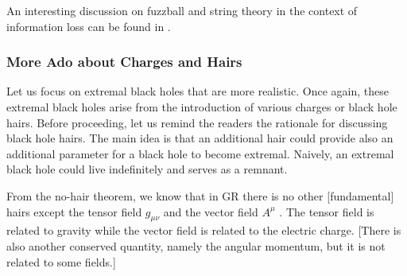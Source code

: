 \documentclass[12pt]{article}
\newcommand{\2}{$^2$}
\newcommand{\3}{$^3$}
\newcommand{\4}{$_4$}
\newcommand{\5}{$_5$}
\begin{document}
An interesting discussion on fuzzball and string theory in the context of information loss can be found in \cite{bena}.

\subsubsection{More Ado about Charges and Hairs}

Let us focus on extremal black holes that are more realistic. Once again, these extremal black holes arise from the introduction of various charges or black hole hairs. 
Before proceeding, let us remind the readers the rationale for discussing black hole hairs. The main idea is that an additional hair could provide also an additional parameter for a black hole to become extremal. Naively, an extremal black hole could live indefinitely and serves as a remnant.  

From the no-hair theorem, we know that in GR there is no other [fundamental] hairs except the tensor field $g_{\mu\nu}$ and the vector field $A^{\mu}$ \cite{Teitelboim:1972qx}. The tensor field is related to gravity while the vector field is related to the electric charge. [There is also another conserved quantity, namely the angular momentum, but it is not related to some fields.]
\end{document}
